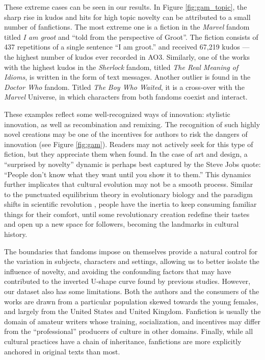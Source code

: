 \documentclass[letterpaper]{article} %
\begin{document}
These extreme cases can be seen in our results. In Figure \ref{fig:gam_topic}, the sharp rise in kudos and hits for high topic novelty can be attributed to a small number of fanfictions. The most extreme one is a fiction in the \emph{Marvel} fandom titled \emph{I am groot} and ``told from the perspective of Groot''. The fiction consists of 437 repetitions of a single sentence ``I am groot.'' and received 67,219 kudos --- the highest number of kudos ever recorded in AO3. Similarly, one of the works with the highest kudos in the \emph{Sherlock} fandom, titled \emph{The Real Meaning of Idioms}, is written in the form of text messages. Another outlier is found in the \emph{Doctor Who} fandom. Titled \emph{The Boy Who Waited}, it is a cross-over with the \emph{Marvel} Universe, in which characters from both fandoms coexist and interact. 

These examples reflect some well-recognized ways of innovation: stylistic innovation, as well as recombination and remixing. The recognition of such highly novel creations may be one of the incentives for authors to risk the dangers of innovation (see Figure \ref{fig:gam}). Readers may not actively seek for this type of fiction, but they appreciate them when found. In the case of art and design, a ``surprised by novelty'' dynamic is perhaps best captured by the Steve Jobs quote: ``People don't know what they want until you show it to them.'' This dynamics further implicates that cultural evolution may not be a smooth process. Similar to the punctuated equilibrium theory in evolutionary biology \cite{gould1972punctuated} and the paradigm shifts in scientific revolution \cite{kuhn2012structure}, people have the inertia to keep consuming familiar things for their comfort, until some revolutionary creation redefine their tastes and open up a new space for followers, becoming the landmarks in cultural history.

The boundaries that fandoms impose on themselves provide a natural control for the variation in subjects, characters and settings, allowing us to better isolate the influence of novelty, and avoiding the confounding factors that may have contributed to the inverted U-shape curve found by previous studies. However, our dataset also has some limitations. Both the authors and the consumers of the works are drawn from a particular population skewed towards the young females, and largely from the United States and United Kingdom. Fanfiction is usually the domain of amateur writers whose training, socialization, and incentives may differ from the ``professional'' producers of culture in other domains. Finally, while all cultural practices have a chain of inheritance, fanfictions are more explicitly anchored in original texts than most.
\end{document}
